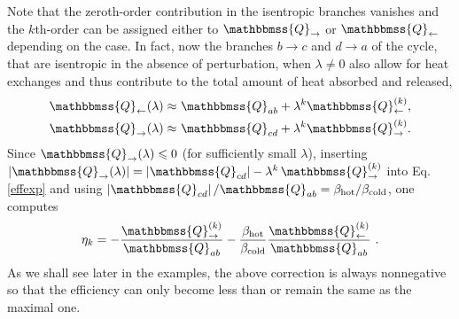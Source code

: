 \documentclass[aps,pra,floatfix,twocolumn,groupedaddress,superscriptaddress,nofootinbib,notitlepage,amsmath,amssymb,]{revtex4-1}
\begin{document}
Note that the zeroth-order contribution in the isentropic branches vanishes and the $k$th-order can be assigned either to $\mathbbmss{Q}_{\rightarrow}$ or $\mathbbmss{Q}_{\leftarrow}$ depending on the case. In fact, now the branches $b\to c$ and $d\to a$ of the cycle, that are isentropic in the absence of perturbation, when $\lambda\neq0$ also allow for heat exchanges and thus contribute
to the total amount of heat absorbed and released,
\begin{align}
\label{pertheat1}
\mathbbmss{Q}_{\leftarrow}(\lambda) \approx\ & \mathbbmss{Q}_{ab}+\lambda^{k} \mathbbmss{Q}^{(k )}_{\leftarrow},\\
\label{pertheat2}
\mathbbmss{Q}_{\rightarrow}(\lambda) \approx\ & \mathbbmss{Q}_{cd}+\lambda^{k}\mathbbmss{Q}^{(k )}_{\rightarrow} .
\end{align}
Since $\mathbbmss{Q}_{\rightarrow}(\lambda)\leqslant 0$ (for sufficiently small $\lambda$), inserting $\left|\mathbbmss{Q}_{\rightarrow}(\lambda)\right|=\left|\mathbbmss{Q}_{cd}\right|-\lambda^{k}\,\mathbbmss{Q}^{(k )}_{\rightarrow}$ into Eq. \eqref{effexp} and using $\left|\mathbbmss{Q}_{cd}\right|/\mathbbmss{Q}_{ab}=\beta_{\mathrm{hot}}/\beta_{\mathrm{cold}}$, one computes
\begin{equation}
\label{etak}
\eta_{k}=-\frac{\mathbbmss{Q}^{(k )}_{\rightarrow}}{\mathbbmss{Q}_{ab}}-\frac{\beta_{\mathrm{hot}}}{\beta_{\mathrm{cold}}}\frac{\mathbbmss{Q}^{(k )}_{\leftarrow}}{\mathbbmss{Q}_{ab}}\ .
\end{equation}
As we shall see later in the examples, the above correction is always nonnegative so that the efficiency can only become less than or remain the same as the maximal one.
\end{document}
